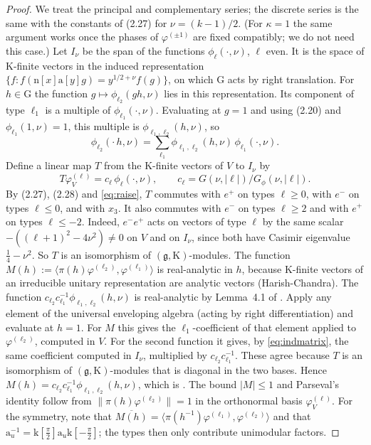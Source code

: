 \documentclass[11pt]{amsart}
\theoremstyle{remark}
\theoremstyle{definition}
\numberwithin{equation}{section}
\newcommand{\G}{\mathrm{G}}
\newcommand{\K}{\mathrm{K}}
\newcommand{\br}[1]{\langle #1\rangle}
\newcommand{\ra}{\mathrm{a}}
\newcommand{\rn}{\mathrm{n}}
\newcommand{\rk}{\mathrm{k}}
\begin{document}
\begin{proof}
We treat the principal and complementary series; the discrete series is the same with the constants of (2.27) for $\nu=(k-1)/2$. (For $\kappa=1$ the same argument works once the phases of $\varphi^{(\pm1)}$ are fixed compatibly; we do not need this case.) Let $I_\nu$ be the span of the functions $\phi_\ell(\cdot,\nu)$, $\ell$ even. It is the space of $\K$-finite vectors in the induced representation $\{f:f(\rn[x]\ra[y]g)=y^{1/2+\nu}f(g)\}$, on which $\G$ acts by right translation. For $h\in\G$ the function $g\mapsto\phi_{\ell_2}(gh,\nu)$ lies in this representation. Its component of type $\ell_1$ is a multiple of $\phi_{\ell_1}(\cdot,\nu)$. Evaluating at $g=1$ and using (2.20) and $\phi_{\ell_1}(1,\nu)=1$, this multiple is $\phi_{\ell_1,\ell_2}(h,\nu)$, so
\begin{equation}\label{eq:indmatrix}
\phi_{\ell_2}(\cdot\,h,\nu)=\sum_{\ell_1}\phi_{\ell_1,\ell_2}(h,\nu)\,\phi_{\ell_1}(\cdot,\nu).
\end{equation}
Define a linear map $T$ from the $\K$-finite vectors of $V$ to $I_\nu$ by
\[
T\varphi_V^{(\ell)}=c_\ell\,\phi_\ell(\cdot,\nu),\qquad c_\ell=G(\nu,|\ell|)/G_\phi(\nu,|\ell|).
\]
By (2.27), (2.28) and \eqref{eq:raise}, $T$ commutes with $e^+$ on types $\ell\ge0$, with $e^-$ on types $\ell\le0$, and with $x_3$. It also commutes with $e^-$ on types $\ell\ge2$ and with $e^+$ on types $\ell\le-2$. Indeed, $e^-e^+$ acts on vectors of type $\ell$ by the same scalar $-((\ell+1)^2-4\nu^2)\ne0$ on $V$ and on $I_\nu$, since both have Casimir eigenvalue $\frac14-\nu^2$. So $T$ is an isomorphism of $(\mathfrak g,\K)$-modules. The function $M(h):=\br{\pi(h)\varphi^{(\ell_2)},\varphi^{(\ell_1)}}$ is real-analytic in $h$, because $\K$-finite vectors of an irreducible unitary representation are analytic vectors (Harish-Chandra). The function $c_{\ell_2}c_{\ell_1}^{-1}\phi_{\ell_1,\ell_2}(h,\nu)$ is real-analytic by Lemma~4.1 of \cite{GM1}. Apply any element of the universal enveloping algebra (acting by right differentiation) and evaluate at $h=1$. For $M$ this gives the $\ell_1$-coefficient of that element applied to $\varphi^{(\ell_2)}$, computed in $V$. For the second function it gives, by \eqref{eq:indmatrix}, the same coefficient computed in $I_\nu$, multiplied by $c_{\ell_2}c_{\ell_1}^{-1}$. These agree because $T$ is an isomorphism of $(\mathfrak g,\K)$-modules that is diagonal in the two bases. Hence $M(h)=c_{\ell_2}c_{\ell_1}^{-1}\phi_{\ell_1,\ell_2}(h,\nu)$, which is \cite[(2.30)]{GM1}. The bound $|M|\le1$ and Parseval's identity follow from $\|\pi(h)\varphi^{(\ell_2)}\|=1$ in the orthonormal basis $\varphi_V^{(\ell)}$. For the symmetry, note that $\overline{M(h)}=\br{\pi(h^{-1})\varphi^{(\ell_1)},\varphi^{(\ell_2)}}$ and that $\ra_u^{-1}=\rk[\frac\pi2]\ra_u\rk[-\frac\pi2]$; the types then only contribute unimodular factors.
\end{proof}
\end{document}
